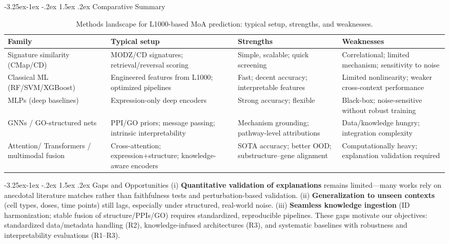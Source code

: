\documentclass[12pt,a4paper]{article}
\makeatletter
\renewcommand\subsection{\@startsection{subsection}{2}{\z@}%
  {-3.25ex\@plus-1ex \@minus-.2ex}%
  {1.5ex \@plus.2ex}%
  {\normalfont\normalsize\bfseries}}
\makeatother
\begin{document}
\subsection{Comparative Summary}
\begin{table}[h]
  \centering
  \caption{Methods landscape for L1000-based MoA prediction: typical setup, strengths, and weaknesses.}
  \begin{tabular}{p{3.4cm} p{4.6cm} p{3.4cm} p{3.4cm}}
    \toprule
    \textbf{Family} & \textbf{Typical setup} & \textbf{Strengths} & \textbf{Weaknesses} \\
    \midrule
    Signature similarity (CMap/CD) &
    MODZ/CD signatures; retrieval/reversal scoring \cite{subramanian2017next,duan2016l1000cds2} &
    Simple, scalable; quick screening &
    Correlational; limited mechanism; sensitivity to noise \\
    \addlinespace
    Classical ML (RF/SVM/XGBoost) &
    Engineered features from L1000; optimized pipelines \cite{lu2021drug} &
    Fast; decent accuracy; interpretable features &
    Limited nonlinearity; weaker cross-context performance \\
    \addlinespace
    MLPs (deep baselines) &
    Expression-only deep encoders \cite{mcdermott2019deep} &
    Strong accuracy; flexible &
    Black-box; noise-sensitive without robust training \\
    \addlinespace
    GNNs / GO-structured nets &
    PPI/GO priors; message passing; intrinsic interpretability \cite{mcdermott2019deep,samal2022opportunities} &
    Mechanism grounding; pathway-level attributions &
    Data/knowledge hungry; integration complexity \\
    \addlinespace
    Attention/ Transformers / multimodal fusion &
    Cross-attention; expression+structure; knowledge-aware encoders \cite{pham2021deep,wu2022deep,stahlschmidt2022multimodal,elabd2024simple} &
    SOTA accuracy; better OOD; substructure–gene alignment &
    Computationally heavy; explanation validation required \\
    \bottomrule
  \end{tabular}
\end{table}

\subsection{Gaps and Opportunities}
(i) \textbf{Quantitative validation of explanations} remains limited—many works rely on anecdotal literature matches rather than faithfulness tests and perturbation-based validation. (ii) \textbf{Generalization to unseen contexts} (cell types, doses, time points) still lags, especially under structured, real-world noise. (iii) \textbf{Seamless knowledge ingestion} (ID harmonization; stable fusion of structure/PPIs/GO) requires standardized, reproducible pipelines. These gaps motivate our objectives: standardized data/metadata handling (R2), knowledge-infused architectures (R3), and systematic baselines with robustness and interpretability evaluations (R1–R3).
\end{document}
